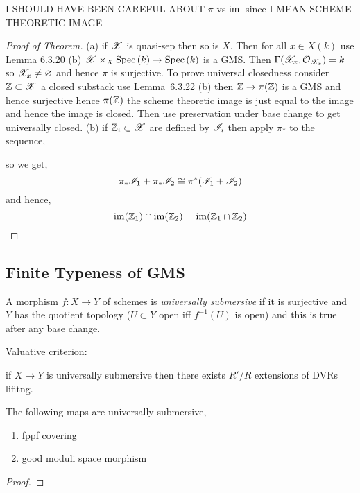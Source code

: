 \documentclass[12pt]{article}
\begin{document}
I SHOULD HAVE BEEN CAREFUL ABOUT $\pi$ vs $\operatorname{\mathrm{im}}{}$ since I MEAN SCHEME THEORETIC IMAGE

\begin{proof}[Proof of Theorem]
(a) if $\mathscr{X}$ is quasi-sep then so is $X$. Then for all $x \in X(k)$ use Lemma 6.3.20 (b) $\mathscr{X} \times_X \mathrm{Spec}\left( k \right) \to \mathrm{Spec}\left( k \right)$ is a GMS. Then $\Gamma(\mathscr{X}_x, \mathcal{O}_{\mathscr{X}_x}) = k$ so $\mathscr{X}_x \neq \varnothing$ and hence $\pi$ is surjective. To prove universal closedness consider $\mathbb{Z} \subset \mathscr{X}$ a closed substack use Lemma~6.3.22 (b) then $\mathbb{Z} \to \pi(\mathbb{Z})$ is a GMS and hence surjective hence $\pi(\mathbb{Z})$ the scheme theoretic image is just equal to the image and hence the image is closed. Then use preservation under base change to get universally closed. (b) if $\mathbb{Z}_i \subset \mathscr{X}$ are defined by $\mathscr{I}_i$ then apply $\pi_*$ to the sequence,
\begin{center}
\end{center}
so we get,
\[ \pi_* \mathscr{I}_1 + \pi_* \mathscr{I}_2 \cong \pi^* (\mathscr{I}_1 + \mathscr{I}_2) \]
and hence,
\[ \operatorname{\mathrm{im}}(\mathbb{Z}_1) \cap \operatorname{\mathrm{im}}(\mathbb{Z}_2) = \operatorname{\mathrm{im}}(\mathbb{Z}_1 \cap \mathbb{Z}_2) \]
\end{proof}

\subsection{Finite Typeness of GMS}

\begin{defn}
A morphism $f : X \to Y$ of schemes is \textit{universally submersive} if it is surjective and $Y$ has the quotient topology ($U \subset Y$ open iff $f^{-1}(U)$ is open) and this is true after any base change. 
\end{defn}

\begin{lemma}
Valuative criterion:
\begin{center}
\end{center}
if $X \to Y$ is universally submersive then there exists $R' / R$ extensions of DVRs lifitng. 
\end{lemma}

\begin{example}
The following maps are universally submersive,
\begin{enumerate}
\item fppf covering
\item good moduli space morphism
\end{enumerate}

\begin{proof}

\end{proof}
\end{example}
\end{document}
